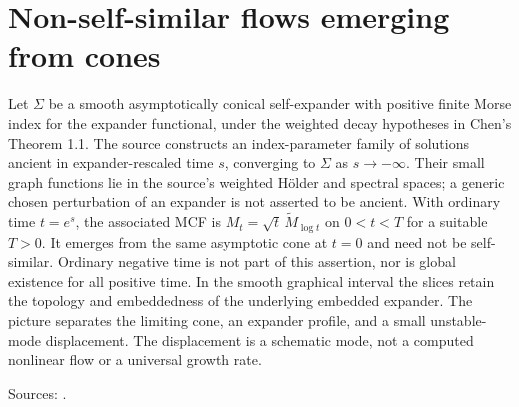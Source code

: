 \chapter{Non-self-similar flows emerging from cones}\label{sec:catalogue-flows-emerging-from-cones}
\begin{example}\label{ex:catalogue-flows-emerging-from-cones}
Let $\Sigma$ be a smooth asymptotically conical self-expander with positive finite Morse index for the expander functional, under the weighted decay hypotheses in Chen's Theorem 1.1. The source constructs an index-parameter family of solutions ancient in expander-rescaled time $s$, converging to $\Sigma$ as $s\to-\infty$. Their small graph functions lie in the source's weighted Hölder and spectral spaces; a generic chosen perturbation of an expander is not asserted to be ancient.
With ordinary time $t=e^s$, the associated MCF is $M_t=\sqrt t\,\widetilde M_{\log t}$ on $0<t<T$ for a suitable $T>0$. It emerges from the same asymptotic cone at $t=0$ and need not be self-similar. Ordinary negative time is not part of this assertion, nor is global existence for all positive time. In the smooth graphical interval the slices retain the topology and embeddedness of the underlying embedded expander. The picture separates the limiting cone, an expander profile, and a small unstable-mode displacement. The displacement is a schematic mode, not a computed nonlinear flow or a universal growth rate.
\par Sources: \cite{CatChen2026}.
\end{example}

